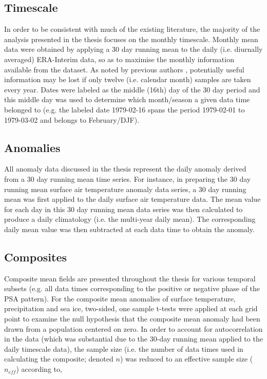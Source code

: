 
\subsection{Timescale}
In order to be consistent with much of the existing literature, the majority of the analysis presented in the thesis focuses on the monthly timescale. Monthly mean data were obtained by applying a 30 day running mean to the daily (i.e. diurnally averaged) ERA-Interim data, so as to maximise the monthly information available from the dataset. As noted by previous authors \citep[e.g.][]{Kidson1988}, potentially useful information may be lost if only twelve (i.e. calendar month) samples are taken every year. Dates were labeled as the middle (16th) day of the 30 day period and this middle day was used to determine which month/season a given data time belonged to (e.g. the labeled date 1979-02-16 spans the period 1979-02-01 to 1979-03-02 and belongs to February/DJF). 

\subsection{Anomalies}
All anomaly data discussed in the thesis represent the daily anomaly derived from a 30 day running mean time series. For instance, in preparing the 30 day running mean surface air temperature anomaly data series, a 30 day running mean was first applied to the daily surface air temperature data. The mean value for each day in this 30 day running mean data series was then calculated to produce a daily climatology (i.e. the multi-year daily mean). The corresponding daily mean value was then subtracted at each data time to obtain the anomaly.  

\subsection{Composites}
Composite mean fields are presented throughout the thesis for various temporal subsets (e.g. all data times corresponding to the positive or negative phase of the PSA pattern). For the composite mean anomalies of surface temperature, precipitation and sea ice, two-sided, one sample t-tests were applied at each grid point to examine the null hypothesis that the composite mean anomaly had been drawn from a population centered on zero. In order to account for autocorrelation in the data (which was substantial due to the 30-day running mean applied to the daily timescale data), the sample size (i.e. the number of data times used in calculating the composite; denoted $n$) was reduced to an effective sample size ($n_{eff}$) according to,

